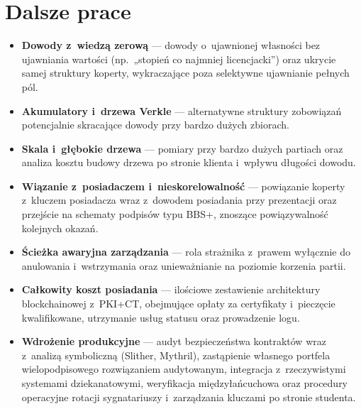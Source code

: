 \section{Dalsze prace}
\label{sec:dalsze-prace}

\begin{itemize}
  \item \textbf{Dowody z~wiedzą zerową} --- dowody o~ujawnionej własności bez
        ujawniania wartości (np.\ „stopień co najmniej licencjacki'') oraz ukrycie
        samej struktury koperty, wykraczające poza selektywne ujawnianie pełnych
        pól.
  \item \textbf{Akumulatory i~drzewa Verkle} --- alternatywne struktury zobowiązań
        potencjalnie skracające dowody przy bardzo dużych zbiorach.
  \item \textbf{Skala i~głębokie drzewa} --- pomiary przy bardzo dużych partiach
        oraz analiza kosztu budowy drzewa po stronie klienta i~wpływu długości
         dowodu.
  \item \textbf{Wiązanie z~posiadaczem i~nieskorelowalność} --- powiązanie
        koperty z~kluczem posiadacza wraz z~dowodem posiadania przy prezentacji
        oraz przejście na schematy podpisów typu BBS+, znoszące powiązywalność
        kolejnych okazań.
  \item \textbf{Ścieżka awaryjna zarządzania} --- rola strażnika z~prawem
        wyłącznie do anulowania i~wstrzymania oraz unieważnianie na poziomie
        korzenia partii.
  \item \textbf{Całkowity koszt posiadania} --- ilościowe zestawienie architektury
        blockchainowej z~PKI+CT, obejmujące opłaty za certyfikaty i~pieczęcie
        kwalifikowane, utrzymanie usług statusu oraz prowadzenie logu.
  \item \textbf{Wdrożenie produkcyjne} --- audyt bezpieczeństwa kontraktów wraz
        z~analizą symboliczną (Slither, Mythril), zastąpienie własnego portfela
        wielopodpisowego rozwiązaniem audytowanym, integracja z~rzeczywistymi
        systemami dziekanatowymi, weryfikacja międzyłańcuchowa oraz procedury
        operacyjne rotacji sygnatariuszy i~zarządzania kluczami po stronie
        studenta.
\end{itemize}
